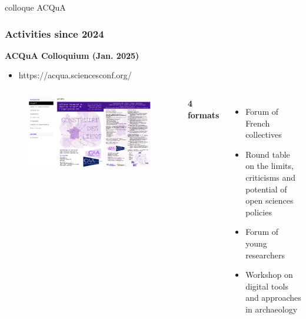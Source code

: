 \documentclass[t,aspectratio=169,xcolor=dvipsnames]{beamer}
\begin{document}
\begin{frame}{colloque ACQuA}

    \frametitle{Activities since 2024} 

    \begin{block}{\textbf{ACQuA Colloquium (Jan. 2025)}}
    	\begin{itemize}
    		\item https://acqua.sciencesconf.org/
    	\end{itemize}
    \end{block}
    
    
    \begin{columns}[t]
    	
    	
    	\begin{figure}
    		\includegraphics[height=0.48\textheight]{figures/acqua2025.png}
    	\end{figure}
    	
    	
    	\textbf{4 formats}
    	
    	\begin{itemize}
    		\item Forum of French collectives %
    		\item Round table on the limits, criticisms and potential of open sciences policies %
    		\item Forum of young researchers %
    		\item Workshop on digital tools and approaches in archaeology %
    	\end{itemize}
    	
    \end{columns}
  
\end{frame}
\end{document}
